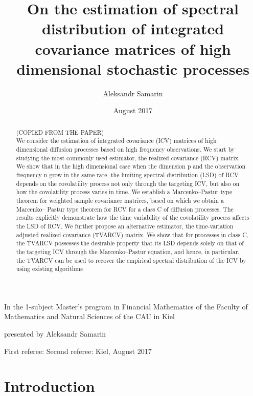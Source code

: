 \documentclass[a4paper,11pt]{article}
\title{On the estimation of spectral distribution of integrated covariance matrices of high dimensional stochastic processes}
\author{Aleksandr Samarin}
\date{August 2017}
\theoremstyle{plain}
\theoremstyle{definition}
\begin{document}
	\maketitle
	
	In the 1-subject Master's program in Financial Mathematics of the Faculty of Mathematics and Natural Sciences of the CAU in Kiel
	
	presented by Aleksandr Samarin
	
	First referee:
	Second referee:
	Kiel, August 2017
	
	\pagebreak
	\begin{abstract}
		
		(COPIED FROM THE PAPER) \\
		We consider the estimation of integrated covariance (ICV) matrices
		of high dimensional diffusion processes based on high frequency
		observations. We start by studying the most commonly used estimator,
		the realized covariance (RCV) matrix. We show that in the
		high dimensional case when the dimension p and the observation frequency
		n grow in the same rate, the limiting spectral distribution
		(LSD) of RCV depends on the covolatility process not only through
		the targeting ICV, but also on how the covolatility process varies in
		time. We establish a Marcenko–Pastur type theorem for weighted
		sample covariance matrices, based on which we obtain a Marcenko–
		Pastur type theorem for RCV for a class C of diffusion processes.
		The results explicitly demonstrate how the time variability of the
		covolatility process affects the LSD of RCV. We further propose
		an alternative estimator, the time-variation adjusted realized covariance
		(TVARCV) matrix. We show that for processes in class C, the
		TVARCV possesses the desirable property that its LSD depends
		solely on that of the targeting ICV through the Marcenko–Pastur
		equation, and hence, in particular, the TVARCV can be used to recover
		the empirical spectral distribution of the ICV by using existing
		algorithms
	\end{abstract}
	
	\pagebreak
	\tableofcontents
	
	\pagebreak
	\part{Introduction}
	
\end{document}
